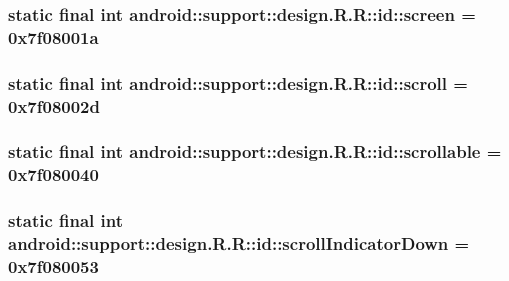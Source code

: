 \hypertarget{classandroid_1_1support_1_1design_1_1_r_1_1id_8816c397468a278070ebd05438d9e86a}{
\subsubsection[{screen}]{\setlength{\rightskip}{0pt plus 5cm}static final int android::support::design.R.R::id::screen = 0x7f08001a}}
\label{classandroid_1_1support_1_1design_1_1_r_1_1id_8816c397468a278070ebd05438d9e86a}


\hypertarget{classandroid_1_1support_1_1design_1_1_r_1_1id_ff69379e37e9cb8f8648604f21642f0e}{
\subsubsection[{scroll}]{\setlength{\rightskip}{0pt plus 5cm}static final int android::support::design.R.R::id::scroll = 0x7f08002d}}
\label{classandroid_1_1support_1_1design_1_1_r_1_1id_ff69379e37e9cb8f8648604f21642f0e}


\hypertarget{classandroid_1_1support_1_1design_1_1_r_1_1id_f4ad64e1f6e7beab3d15a58da5747e52}{
\subsubsection[{scrollable}]{\setlength{\rightskip}{0pt plus 5cm}static final int android::support::design.R.R::id::scrollable = 0x7f080040}}
\label{classandroid_1_1support_1_1design_1_1_r_1_1id_f4ad64e1f6e7beab3d15a58da5747e52}


\hypertarget{classandroid_1_1support_1_1design_1_1_r_1_1id_9d40ba0519a609548b6b5dbba1669c20}{
\subsubsection[{scrollIndicatorDown}]{\setlength{\rightskip}{0pt plus 5cm}static final int android::support::design.R.R::id::scrollIndicatorDown = 0x7f080053}}
\label{classandroid_1_1support_1_1design_1_1_r_1_1id_9d40ba0519a609548b6b5dbba1669c20}


